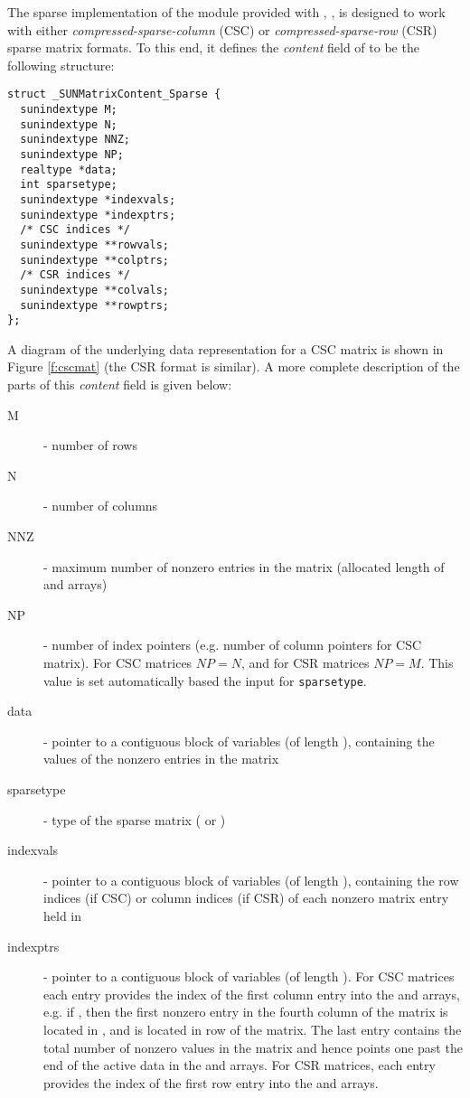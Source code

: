 
The sparse implementation of the {\sunmatrix} module provided with
{\sundials}, {\sunmatsparse}, is designed to work with either
\emph{compressed-sparse-column} (CSC) or \emph{compressed-sparse-row}
(CSR) sparse matrix formats.  To this end, it defines the {\em
content} field of  to be the following structure:
\begin{verbatim} 
struct _SUNMatrixContent_Sparse {
  sunindextype M;
  sunindextype N;
  sunindextype NNZ;
  sunindextype NP;
  realtype *data;
  int sparsetype;
  sunindextype *indexvals;
  sunindextype *indexptrs;
  /* CSC indices */
  sunindextype **rowvals;
  sunindextype **colptrs;
  /* CSR indices */
  sunindextype **colvals;
  sunindextype **rowptrs;
};
\end{verbatim}
A diagram of the underlying data representation for a
CSC matrix is shown in Figure \ref{f:cscmat} (the CSR format is
similar).  A more complete description of the parts of
this \emph{content} field is given below: 
\begin{description}
  \item[M]  - number of rows
  \item[N]  - number of columns
  \item[NNZ]  - maximum number of nonzero entries in the matrix
    (allocated length of  and  arrays)
  \item[NP]  - number of index pointers (e.g. number of column pointers for 
    CSC matrix). For CSC matrices $NP=N$, and for CSR matrices $NP=M$. This 
    value is set automatically based the input for \verb|sparsetype|. 
  \item[data]  - pointer to a contiguous block of 
    variables (of length ), containing the values of the
    nonzero entries in the matrix
  \item[sparsetype]  - type of the sparse matrix ( or )
  \item[indexvals] - pointer to a contiguous block of  variables
    (of length ), containing the row indices (if CSC) or column
   indices (if CSR) of each nonzero matrix entry held in 
  \item[indexptrs]  - pointer to a contiguous block of 
    variables (of length ). For CSC matrices each 
    entry provides the index of the first column entry into the 
     and  arrays, e.g. if , then 
    the first nonzero entry in the fourth column of the matrix is 
    located in , and is located in row  of the 
    matrix.  The last entry contains the total number of nonzero values in 
    the matrix and hence points one past the end of the active data in the 
     and  arrays. For CSR matrices, each entry provides 
    the index of the first row entry into the  and  
    arrays.
\end{description}
